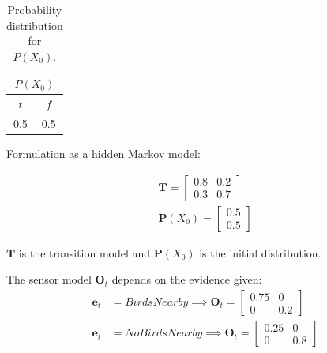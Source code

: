 \documentclass[11pt, a4paper, english]{NTNUoving}
\begin{document}
\begin{oppgave}
\begin{punkt}
\begin{table}[H]
    \centering
    \begin{tabular}{|c|c|}
        \hline
       \multicolumn{2}{|c|}{$P(X_0)$} \\ [0.5ex]
        \hline
        $t$ & $f$ \\
        \hline
        0.5 & 0.5 \\ [1.0ex]
        \hline
\end{tabular}
    \caption{Probability distribution for $P(X_0)$.}
    \label{tab:3}
\end{table}

Formulation as a hidden Markov model:

\begin{align*}
    \textbf{T} = \begin{bmatrix}
        0.8 & 0.2\\
        0.3 & 0.7
    \end{bmatrix} \\
    \textbf{P}(X_0) = \begin{bmatrix}
        0.5\\
        0.5
    \end{bmatrix}
\end{align*}

$\textbf{T}$ is the transition model and
$\textbf{P}(X_0)$ is the initial distribution.

The sensor model $\textbf{O}_t$ depends on the evidence given:
\begin{align*}
    \textbf{e}_t &= BirdsNearby \implies \textbf{O}_t = \begin{bmatrix}
        0.75 & 0\\
        0 & 0.2
    \end{bmatrix} \\
    \textbf{e}_t &= NoBirdsNearby \implies \textbf{O}_t = \begin{bmatrix}
        0.25 & 0\\
        0 & 0.8
    \end{bmatrix}
\end{align*}
\end{punkt}

\begin{punkt}


\end{punkt}
\end{oppgave}
\end{document}
